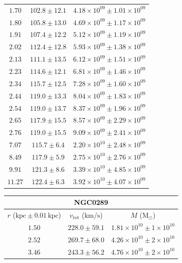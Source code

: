\documentclass{article}
\newcommand\solmass{\textrm{M}_\odot}
\newcommand\kpc{\textrm{kpc}}
\newcommand\kmps{\textrm{km}/\textrm{s}}
\newcommand\vrot{\ensuremath{v_{\textrm{rot}}}}
\begin{document}
\begin{table}[h!]
\begin{tabular}{|c|c|c|}
        $1.70$ & $102.8 \pm 12.1$ & $4.18\times 10^{09} \pm 1.01\times 10^{09}$ \\
        $1.80$ & $105.8 \pm 13.0$ & $4.69\times 10^{09} \pm 1.17\times 10^{09}$ \\
        $1.91$ & $107.4 \pm 12.2$ & $5.12\times 10^{09} \pm 1.19\times 10^{09}$ \\
        $2.02$ & $112.4 \pm 12.8$ & $5.93\times 10^{09} \pm 1.38\times 10^{09}$ \\
        $2.13$ & $111.1 \pm 13.5$ & $6.12\times 10^{09} \pm 1.51\times 10^{09}$ \\
        $2.23$ & $114.6 \pm 12.1$ & $6.81\times 10^{09} \pm 1.46\times 10^{09}$ \\
        $2.34$ & $115.7 \pm 12.5$ & $7.28\times 10^{09} \pm 1.60\times 10^{09}$ \\
        $2.44$ & $119.0 \pm 13.3$ & $8.04\times 10^{09} \pm 1.83\times 10^{09}$ \\
        $2.54$ & $119.0 \pm 13.7$ & $8.37\times 10^{09} \pm 1.96\times 10^{09}$ \\
        $2.65$ & $117.9 \pm 15.5$ & $8.57\times 10^{09} \pm 2.29\times 10^{09}$ \\
        $2.76$ & $119.0 \pm 15.5$ & $9.09\times 10^{09} \pm 2.41\times 10^{09}$ \\
        $7.07$ & $115.7 \pm 6.4$ & $2.20\times 10^{10} \pm 2.48\times 10^{09}$ \\
        $8.49$ & $117.9 \pm 5.9$ & $2.75\times 10^{10} \pm 2.76\times 10^{09}$ \\
        $9.91$ & $121.3 \pm 8.6$ & $3.39\times 10^{10} \pm 4.85\times 10^{09}$ \\
        $11.27$ & $122.4 \pm 6.3$ & $3.92\times 10^{10} \pm 4.07\times 10^{09}$ \\
        \hline
    \end{tabular}
    \hfill
    \begin{tabular}{|c|c|c|}
        \hline
        \multicolumn{3}{|c|}{NGC0289} \\
        \hline
        $r$ ($\kpc \pm 0.01 \,\kpc$) & $\vrot$ ($\kmps$) & $M$ ($\solmass$) \\
        \hline
        $1.50$ & $228.0 \pm 59.1$ & $1.81\times 10^{10} \pm 1\times 10^{10}$ \\
        $2.52$ & $269.7 \pm 68.0$ & $4.26\times 10^{10} \pm 2\times 10^{10}$ \\
        $3.46$ & $243.3 \pm 56.2$ & $4.76\times 10^{10} \pm 2\times 10^{10}$ \\

\end{tabular}
\end{table}
\end{document}
